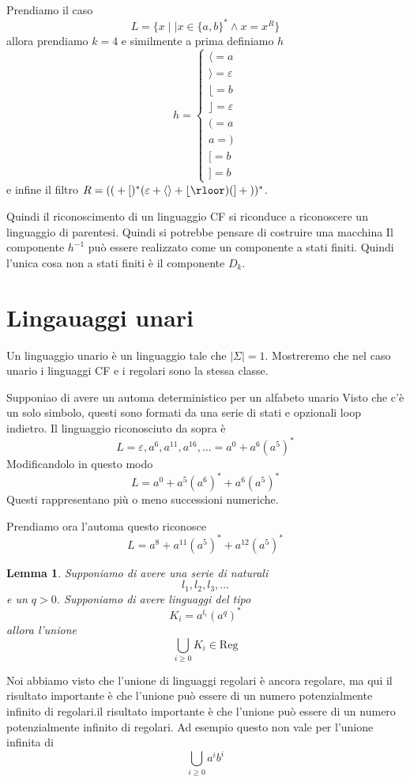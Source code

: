 \documentclass[12pt]{article}
\newtheorem{lemma}{Lemma}
\begin{document}
\begin{tcolorbox}[breakable]
	Prendiamo il caso 
	$$L = \{ x \mid \mid x \in \{a, b\}^* \wedge x = x^R \} $$
	allora prendiamo $k = 4$ e similmente a prima definiamo $h$
	$$ h = 
	\begin{cases} 
		\langle = a \\
		\rangle = \varepsilon \\
		\lfloor = b \\
		\rfloor = \varepsilon \\
		( = a \\ 
		a = ) \\ 
		[ = b \\ 
		] = b 
	\end{cases} $$ 
	e infine il filtro $R = (\text{\texttt{$($}} + \text{\texttt{$[$}})^* ( \varepsilon + \text{\texttt{$\langle \rangle$}} + \text{\texttt{$\lfloor \rloor$}}) (\text{\texttt{$]$}} + \text{\texttt{$)$}})^*$.
\end{tcolorbox}
Quindi il riconoscimento di un linguaggio CF si riconduce a riconoscere un linguaggio di parentesi.
Quindi si potrebbe pensare di costruire una macchina
Il componente $h^{-1}$ può essere realizzato come un componente a stati finiti.
Quindi l'unica cosa non a stati finiti è il componente $D_k$.

\section{Lingauaggi unari}
Un linguaggio unario è un linguaggio tale che $| \Sigma | = 1$.
Mostreremo che nel caso unario i linguaggi CF e i regolari sono la stessa classe.

Supponiao di avere un automa deterministico per un alfabeto unario
Visto che c'è un solo simbolo, questi sono formati da una serie di stati e opzionali loop indietro.
Il linguaggio riconosciuto da sopra è
$$ L = \varepsilon, a^6, a^11, a^16, \dots = a^0 + a^6(a^5)^* $$
Modificandolo in questo modo
$$ L = a^0 + a^5(a^6)^* + a^6(a^5)^*$$
Questi rappresentano più o meno successioni numeriche.

Prendiamo ora l'automa
questo riconosce
$$ L = a^8 + a^{11}(a^5)^* + a^{12}(a^5)^* $$

\begin{lemma}
	Supponiamo di avere una serie di naturali
	$$ l_1, l_2, l_3, \dots $$
	e un $q > 0$.
	Supponiamo di avere linguaggi del tipo
	$$ K_i = a^{l_i} (a^q)^* $$
	allora l'unione
	$$ \bigcup_{i \geq 0} K_i \in \text{Reg} $$
\end{lemma}
Noi abbiamo visto che l'unione di linguaggi regolari è ancora regolare, ma qui il risultato importante è che l'unione può essere di un numero potenzialmente infinito di regolari.il risultato importante è che l'unione può essere di un numero potenzialmente infinito di regolari.
Ad esempio questo non vale per l'unione infinita di 
$$ \bigcup_{i \geq 0} a^i b^i $$
\end{document}
